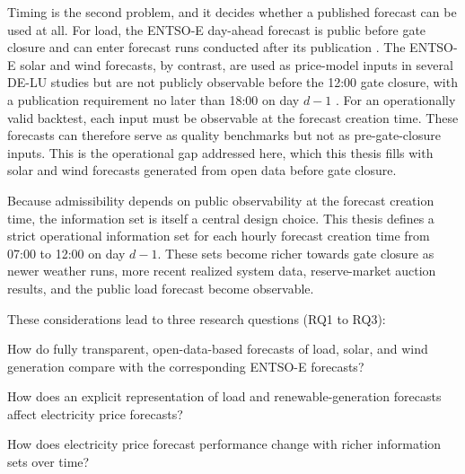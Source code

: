 Timing is the second problem, and it decides whether a published forecast can be
used at all. For load, the
\mbox{ENTSO-E} day-ahead forecast is public before gate closure and can enter
forecast runs conducted after its publication \cite{euRegulation543_2013}. The
\mbox{ENTSO-E} solar and wind forecasts, by contrast, are used as price-model
inputs in several \mbox{DE-LU} studies
\cite{trebbien2023probabilistic,marcjasz2023distributional,hilger2024multivariate}
but are not publicly observable before the 12:00 gate closure, with a
publication requirement no later than 18:00 on day \(d-1\)
\cite{kleinebrahm2026energyarena,entsoeTransparency,euRegulation543_2013}. For
an operationally valid backtest, each input must be observable at the forecast
creation time. These forecasts can therefore serve as quality benchmarks but
not as pre-gate-closure inputs.
This is the operational gap addressed here, which this thesis fills with solar
and wind forecasts generated from open data before gate closure.

Because admissibility depends on public observability at the forecast creation
time, the information set is itself a central design choice. This thesis defines a
strict operational information set for each hourly forecast creation time
from 07:00 to 12:00 on day \(d-1\). These sets become richer towards gate
closure as newer weather runs, more recent
realized system data, reserve-market auction results, and the public load
forecast become observable.

\label{sec:research_questions}
These considerations lead to three research questions (RQ1 to RQ3):

\begin{description}
  \setlength{\itemsep}{0.15em}
  \setlength{\parsep}{0pt}
  \setlength{\topsep}{0.25em}
  \item[\textbf{RQ1:}]\hypertarget{rq:component_forecast_quality}{}
  How do fully transparent, open-data-based forecasts of load, solar, and wind generation compare with the corresponding
  \mbox{ENTSO-E} forecasts?

  \item[\textbf{RQ2:}]\hypertarget{rq:price_impact_generated_forecasts}{}
  How does an explicit representation of load and renewable-generation
  forecasts affect electricity price forecasts?

  \item[\textbf{RQ3:}]\hypertarget{rq:cutoff_sensitivity}{}
  How does electricity price forecast performance change with richer
  information sets over time?
\end{description}

